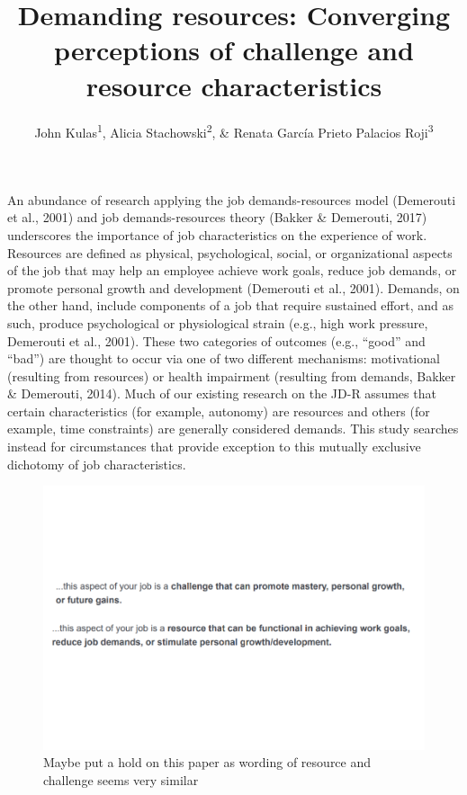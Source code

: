 \documentclass[
  man]{apa6}
\title{Demanding resources: Converging perceptions of challenge and resource characteristics}
\author{John Kulas\textsuperscript{1}, Alicia Stachowski\textsuperscript{2}, \& Renata García Prieto Palacios Roji\textsuperscript{3}}
\date{}
\affiliation{\vspace{0.5cm}\textsuperscript{1} eRg\\\textsuperscript{2} University of Wisconsin - Stout\\\textsuperscript{3} PepsiCo}
\begin{document}
\maketitle

An abundance of research applying the job demands-resources model (Demerouti et al., 2001) and job demands-resources theory (Bakker \& Demerouti, 2017) underscores the importance of job characteristics on the experience of work. Resources are defined as physical, psychological, social, or organizational aspects of the job that may help an employee achieve work goals, reduce job demands, or promote personal growth and development (Demerouti et al., 2001). Demands, on the other hand, include components of a job that require sustained effort, and as such, produce psychological or physiological strain (e.g., high work pressure, Demerouti et al., 2001). These two categories of outcomes (e.g., ``good'' and ``bad'') are thought to occur via one of two different mechanisms: motivational (resulting from resources) or health impairment (resulting from demands, Bakker \& Demerouti, 2014). Much of our existing research on the JD-R assumes that certain characteristics (for example, autonomy) are resources and others (for example, time constraints) are generally considered demands. This study searches instead for circumstances that provide exception to this mutually exclusive dichotomy of job characteristics.

\begin{figure}
\centering
\includegraphics{copy-of-SIOP2023convergence_files/figure-latex/uhoh-1.pdf}
\caption{\label{fig:uhoh}Maybe put a hold on this paper as wording of resource and challenge seems very similar}
\end{figure}
\end{document}
